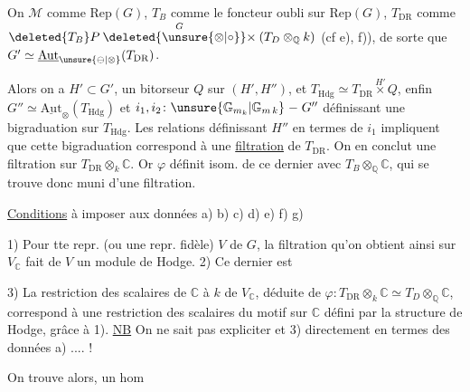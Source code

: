  On  $\mathcal M$ comme $\mathrm{Rep}(G)$, $T_B$  comme le foncteur oubli sur $\mathrm{Rep}(G)$, $T_{\mathrm{DR}}$ comme $\deleted{T_B}P\overset{G}{\deleted{\unsure{\otimes|\circ}}\times}(T_D\otimes_{\mathbb Q}k)$ (cf e), f)),  de sorte que $G'\simeq\underline{\mathrm{Aut}}_{\unsure{\ominus|\otimes}}(T_{\mathrm{DR}})$.


Alors on a $H'\subset G'$, un bitorseur $Q$ sur $(H',H'')$,  et $T_{\mathrm{Hdg}}\simeq T_{\mathrm{DR}}\overset{H'}{\times}Q$, enfin  $G''\simeq\underline{\mathrm{Aut}}_{\otimes}(T_{\mathrm{Hdg}})$ et $i_1,i_2\colon \unsure{\mathbb G_{m_k}|\mathbb G_{m\,k}}\mathrel{-}G''$ définissant une bigraduation sur $T_{\mathrm{Hdg}}$. Les relations  définissant $H''$ en termes de $i_1$ impliquent que cette bigraduation correspond à une  \uline{filtration} de $T_{\mathrm{DR}}$. On en conclut une filtration sur $T_{\mathrm{DR}}\otimes_k\mathbb C$. Or $\varphi$ définit  isom. de ce dernier avec $T_B\otimes_{\mathbb Q}\mathbb C$, qui se trouve donc muni d'une filtration.

\uline{Conditions} à imposer aux données a) b) c) d) e) f) g)

 1) Pour tte repr. (ou une repr. fidèle) $V$ de $G$, la filtration qu'on obtient ainsi sur $V_{\mathbb C}$  fait de $V$ un module de Hodge. 2) Ce dernier est 

3) La restriction des scalaires de $\mathbb C$ à $k$ de $V_{\mathbb C}$, déduite de $\varphi\colon T_{\mathrm{DR}}\otimes_k\mathbb C\simeq T_D\otimes_{\mathbb Q}\mathbb C$, correspond à une restriction des scalaires du motif sur $\mathbb C$ défini par la structure de Hodge, grâce à 1). \uline{NB} On ne sait pas expliciter  et 3)  directement en termes des données a) .... !

On trouve alors,  un hom
{\centering \textsc{}\\
\textit{ }\par}
